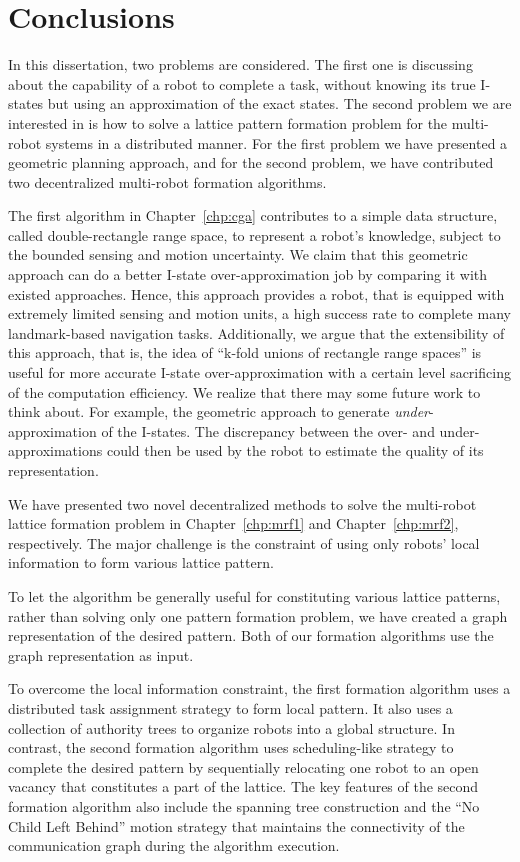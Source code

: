 \chapter{Conclusions}
\label{chp:conc}

In this dissertation, two problems are considered. 
The first one is discussing about the capability of a robot to complete a task, without knowing its true I-states but using an approximation of the exact states.
%
The second problem we are interested in is how to solve a lattice pattern formation problem for the multi-robot systems in a distributed manner. 
%
For the first problem we have presented a geometric planning approach, and for the second problem, we have contributed two decentralized multi-robot formation algorithms.


The first algorithm in Chapter~\ref{chp:cga} contributes to a simple data structure, called double-rectangle range space, to represent a robot's knowledge, subject to the bounded sensing and motion uncertainty. 
%
We claim that this geometric approach can do a better I-state over-approximation job by comparing it with existed approaches. 
%
Hence, this approach provides a robot, that is equipped with extremely limited sensing and motion units, a high success rate to complete many landmark-based navigation tasks.
%
Additionally, we argue that the extensibility of this approach, that is, the idea of ``k-fold unions of rectangle range spaces'' is useful for more accurate I-state over-approximation with a certain level sacrificing of the computation efficiency.
%
We realize that there may some future work to think about. 
For example, the geometric approach to
generate \emph{under}-approximation of the I-states.  
%
The discrepancy between the over- and under-approximations could then be used by the robot to estimate the quality of its representation.

We have presented two novel decentralized methods to solve the multi-robot lattice formation problem in Chapter~\ref{chp:mrf1} and Chapter~\ref{chp:mrf2}, respectively. 
%
The major challenge is the constraint of using only robots' local information to form various lattice pattern.  

To let the algorithm be generally useful for constituting various lattice patterns, rather than solving only one pattern formation problem, we have created a graph representation of the desired pattern.
%
Both of our formation algorithms use the graph representation as input.


To overcome the local information constraint, the first formation algorithm uses a distributed task assignment strategy to form local pattern. 
%
It also uses a collection of authority trees to organize robots into a global structure.
%
In contrast, the second formation algorithm uses scheduling-like strategy to complete the desired pattern by sequentially relocating one robot to an open vacancy that constitutes a part of the lattice. 
%
The key features of the second formation algorithm also include the spanning tree construction and the ``No Child Left Behind'' motion strategy that maintains the connectivity of the communication graph during the algorithm execution.

